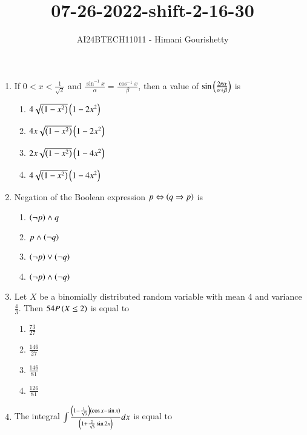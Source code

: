 \documentclass[journal,12pt,onecolumn]{IEEEtran}
\theoremstyle{remark}
\begin{document}

\vspace{3cm}

\title{07-26-2022-shift-2-16-30}
\author{AI24BTECH11011 - Himani Gourishetty}
\maketitle
\bigskip

\renewcommand{\thefigure}{\theenumi}
\renewcommand{\thetable}{\theenumi}
\begin{enumerate}
    \item If $0<x<\frac{1}{\sqrt{2}}$ and $\frac{\sin^{-1}x}{\alpha}=\frac{\cos^{-1}x}{\beta}$, then a value of $\sin\left(\frac{2\pi\alpha}{\alpha+\beta}\right)$ is 
    \begin{enumerate}
        \item $4\sqrt{\left(1-x^2\right)}\left(1-2x^2\right)$
        \item $4x\sqrt{\left(1-x^2\right)}\left(1-2x^2\right)$
        \item $2x\sqrt{\left(1-x^2\right)}\left(1-4x^2\right)$
        \item $4\sqrt{\left(1-x^2\right)}\left(1-4x^2\right)$
    \end{enumerate}
    \item Negation of the Boolean expression $p \Leftrightarrow \left(q \Rightarrow p\right)$ is
    \begin{enumerate}
        \item $\left(\neg p\right) \land q$
        \item $p \land \left(\neg q\right)$
        \item $\left(\neg p\right) \lor \left(\neg q\right)$
        \item $\left(\neg p\right)\land \left(\neg q\right)$
    \end{enumerate}
    \item Let $X$ be a binomially distributed random variable with mean 4 and variance $\frac{4}{3}$. Then $54 P \left(X \leq 2\right)$ is equal to
    \begin{enumerate}
        \item $\frac{73}{27}$
        \item $\frac{146}{27}$
        \item $\frac{146}{81}$
        \item $\frac{126}{81}$
    \end{enumerate}
    \item The integral $\int\frac{\left(1-\frac{1}{\sqrt{3}}\right)\left(\cos x - \sin x\right)}{\left(1+\frac{2}{\sqrt{3}}\sin 2x\right)} dx$ is equal to 
    \begin{enumerate}

\end{enumerate}
\end{enumerate}
\end{document}
